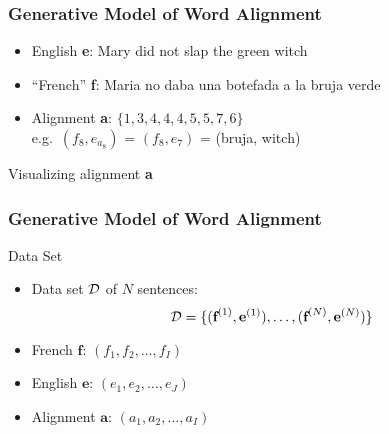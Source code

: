 \begin{frame}
\frametitle{Generative Model of Word Alignment}
\begin{block}{}
\begin{itemize}
\item English \textbf{e}: Mary did not slap the green witch
\item ``French'' \textbf{f}: Maria no daba una botefada a la bruja verde
\item Alignment \textbf{a}: $\{ 1, 3, 4, 4, 4, 5, 5, 7, 6 \}$ \\
e.g.\ $(f_8, e_{a_8})$ = $(f_8, e_7)$ = (bruja, witch)
\end{itemize}
\end{block}\pause
\begin{block}{Visualizing alignment \textbf{a}}

\end{block}
\end{frame}

\begin{frame}
\frametitle{Generative Model of Word Alignment}
\begin{block}{Data Set}
\begin{itemize}[<+->]
\item Data set ${\cal D}$ of $N$ sentences:
\[ {\cal D} = \{ (\textbf{f}^{(1)}, \textbf{e}^{(1)}), \ldots, (\textbf{f}^{(N)}, \textbf{e}^{(N)}) \} \]
\item French $\textbf{f}$: $( f_1, f_2, \ldots, f_I )$
\item English $\textbf{e}$: $( e_1, e_2, \ldots, e_J )$
\item Alignment $\textbf{a}$: $( a_1, a_2, \ldots, a_I )$
\end{itemize}
\end{block}
\end{frame}

